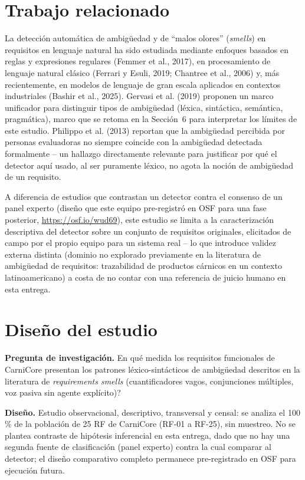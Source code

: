 \documentclass[11pt,a4paper]{article}
\begin{document}
\section{Trabajo relacionado}

La detecci\'on autom\'atica de ambig\"uedad y de ``malos olores'' (\emph{smells}) en requisitos en lenguaje natural ha sido estudiada mediante enfoques basados en reglas y expresiones regulares (Femmer et al., 2017), en procesamiento de lenguaje natural cl\'asico (Ferrari y Esuli, 2019; Chantree et al., 2006) y, m\'as recientemente, en modelos de lenguaje de gran escala aplicados en contextos industriales (Bashir et al., 2025). Gervasi et al. (2019) proponen un marco unificador para distinguir tipos de ambig\"uedad (l\'exica, sint\'actica, sem\'antica, pragm\'atica), marco que se retoma en la Secci\'on~6 para interpretar los l\'imites de este estudio. Philippo et al. (2013) reportan que la ambig\"uedad percibida por personas evaluadoras no siempre coincide con la ambig\"uedad detectada formalmente -- un hallazgo directamente relevante para justificar por qu\'e el detector aqu\'i usado, al ser puramente l\'exico, no agota la noci\'on de ambig\"uedad de un requisito.

A diferencia de estudios que contrastan un detector contra el consenso de un panel experto (dise\~no que este equipo pre-registr\'o en OSF para una fase posterior, \url{https://osf.io/wud69}), este estudio se limita a la caracterizaci\'on descriptiva del detector sobre un conjunto de requisitos originales, elicitados de campo por el propio equipo para un sistema real -- lo que introduce validez externa distinta (dominio no explorado previamente en la literatura de ambig\"uedad de requisitos: trazabilidad de productos c\'arnicos en un contexto latinoamericano) a costa de no contar con una referencia de juicio humano en esta entrega.

\section{Dise\~no del estudio}

\textbf{Pregunta de investigaci\'on.} \textquestiondown En qu\'e medida los requisitos funcionales de CarniCore presentan los patrones l\'exico-sint\'acticos de ambig\"uedad descritos en la literatura de \emph{requirements smells} (cuantificadores vagos, conjunciones m\'ultiples, voz pasiva sin agente expl\'icito)?

\textbf{Dise\~no.} Estudio observacional, descriptivo, transversal y censal: se analiza el 100\,\% de la poblaci\'on de 25 RF de CarniCore (RF-01 a RF-25), sin muestreo. No se plantea contraste de hip\'otesis inferencial en esta entrega, dado que no hay una segunda fuente de clasificaci\'on (panel experto) contra la cual comparar al detector; el dise\~no comparativo completo permanece pre-registrado en OSF para ejecuci\'on futura.
\end{document}
